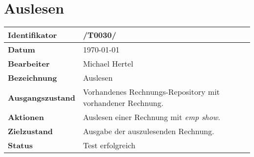 
\section{Auslesen}

\renewcommand{\arraystretch}{1.5}

\begin{center}
 \begin{tabular}{|p{}|p{}|}
	\hline
	\textbf{Identifikator}  & /T0030/ \\
	\hline
	\textbf{Datum} & \today \\
	\hline
	\textbf{Bearbeiter} & Michael Hertel \\
	\hline
	\textbf{Bezeichnung} & Auslesen \\
	\hline
	\textbf{Ausgangszustand} &
		Vorhandenes Rechnungs-Repository mit vorhandener Rechnung. \\
	\hline
	\textbf{Aktionen} &
		Auslesen einer Rechnung mit \textit{emp show}. \\
	\hline
	\textbf{Zielzustand} &
		Ausgabe der auszulesenden Rechnung. \\
	\hline
	\textbf{Status} & Test erfolgreich \\
	\hline
 \end{tabular}
\end{center}
